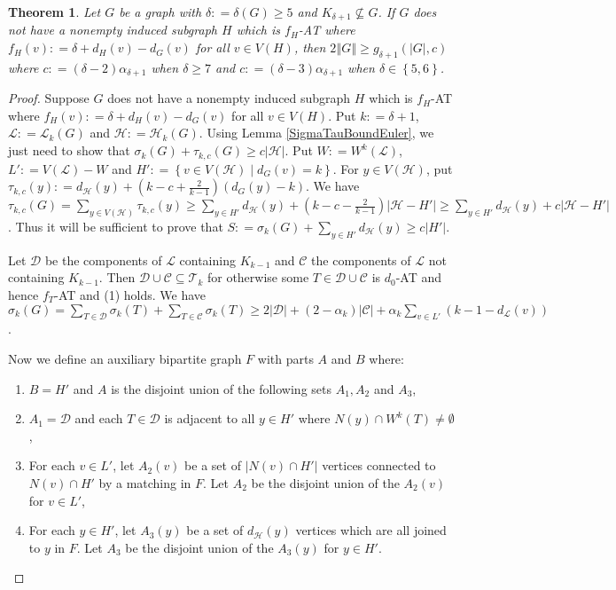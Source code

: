 \documentclass[12pt]{article}
\theoremstyle{plain}
\newtheorem{thm}{Theorem}[section]
\theoremstyle{definition}
\theoremstyle{remark}
\newcommand{\fancy}[1]{\mathcal{#1}}
\newcommand{\CC}{\fancy{C}}
\newcommand{\D}{\fancy{D}}
\newcommand{\T}{\fancy{T}}
\renewcommand{\L}{\fancy{L}}
\newcommand{\HH}{\fancy{H}}
\newcommand{\set}[1]{\left\{ #1 \right\}}
\newcommand{\setb}[3]{\left\{ #1 \in #2 \mid #3 \right\}}
\newcommand{\card}[1]{\left|#1\right|}
\newcommand{\size}[1]{\left\Vert#1\right\Vert}
\newcommand{\parens}[1]{\left( #1 \right)}
\newcommand{\DefinedAs}{\mathrel{\mathop:}=}
\def\D{\fancy{D}}
\begin{document}
\begin{thm}\label{EdgeBoundEuler}
Let $G$ be a graph with $\delta \DefinedAs \delta(G) \geq 5$ and $K_{\delta + 1} \not \subseteq G$. If $G$ does not have a nonempty induced subgraph $H$ which is $f_H$-AT where $f_H(v) \DefinedAs \delta + d_H(v) - d_G(v)$ for all $v \in V(H)$, then $2\size{G} \geq g_{\delta+1}(\card{G}, c)$ where $c \DefinedAs (\delta-2)\alpha_{\delta + 1}$ when $\delta \geq 7$ and $c \DefinedAs (\delta-3)\alpha_{\delta + 1}$ when $\delta \in \set{5,6}$.
\end{thm}
\begin{proof}
Suppose $G$ does not have a nonempty induced subgraph $H$ which is $f_H$-AT where $f_H(v) \DefinedAs \delta + d_H(v) - d_G(v)$ for all $v \in V(H)$. Put $k \DefinedAs \delta + 1$, $\L \DefinedAs \L_k(G)$ and $\HH \DefinedAs \HH_k(G)$.  Using Lemma \ref{SigmaTauBoundEuler}, we just need to show that $\sigma_k(G) + \tau_{k, c}(G) \geq c\card{\HH}$.  Put $W \DefinedAs W^k(\L)$, $L' \DefinedAs V(\L) - W$ and $H' \DefinedAs \setb{v}{V(\HH)}{d_G(v) = k}$.   For $y \in V(\HH)$, put $\tau_{k,c}(y) \DefinedAs d_{\HH}(y) + \parens{k-c + \frac{2}{k-1}}(d_G(y) - k)$.  We have  $\tau_{k,c}(G) = \sum_{y \in V(\HH)} \tau_{k,c}(y) \geq \sum_{y \in H'} d_{\HH}(y) + \parens{k-c - \frac{2}{k-1}}\card{\HH - H'} \geq \sum_{y \in H'} d_{\HH}(y) + c\card{\HH - H'}$.  Thus it will be sufficient to prove that $S \DefinedAs \sigma_k(G) + \sum_{y \in H'} d_{\HH}(y) \geq c\card{H'}$.

Let $\D$ be the components of $\L$ containing $K_{k-1}$ and $\CC$ the components of $\L$ not containing $K_{k-1}$.  Then $\D \cup \CC \subseteq \T_k$ for otherwise some $T \in \D \cup \CC$ is $d_0$-AT and hence $f_T$-AT and (1) holds.  We have $\sigma_k(G) = \sum_{T \in \D} \sigma_k(T) + \sum_{T \in \CC} \sigma_k(T) \geq 2\card{\D} + (2-\alpha_k)\card{\CC} + \alpha_k\sum_{v \in L'} \parens{k-1 - d_{\L}(v)}$.

Now we define an auxiliary bipartite graph $F$ with parts $A$ and $B$ where:

\begin{enumerate}
\item  $B = H'$ and $A$ is the disjoint union of the following sets
$A_1, A_2$ and $A_3$,
\item $A_1 = \D$ and each $T \in \D$ is adjacent to all $y \in H'$
where $N(y) \cap W^k(T) \neq \emptyset$,
\item For each $v \in L'$, let $A_2(v)$ be a set of $\card{N(v) \cap
H'}$ vertices connected to $N(v) \cap H'$ by a matching in $F$.  Let
$A_2$ be the disjoint union of the $A_2(v)$ for $v \in L'$,
\item For each $y \in H'$, let $A_3(y)$ be a set of $d_{\HH}(y)$ vertices
which are all joined to $y$ in $F$.  Let $A_3$ be the disjoint union
of the $A_3(y)$ for $y \in H'$.
\end{enumerate}


\end{proof}
\end{document}
